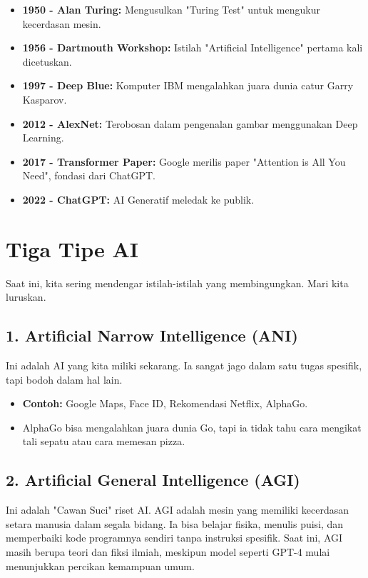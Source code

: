 \begin{itemize}
    \item \textbf{1950 - Alan Turing:} Mengusulkan "Turing Test" untuk mengukur kecerdasan mesin.
    \item \textbf{1956 - Dartmouth Workshop:} Istilah "Artificial Intelligence" pertama kali dicetuskan.
    \item \textbf{1997 - Deep Blue:} Komputer IBM mengalahkan juara dunia catur Garry Kasparov.
    \item \textbf{2012 - AlexNet:} Terobosan dalam pengenalan gambar menggunakan Deep Learning.
    \item \textbf{2017 - Transformer Paper:} Google merilis paper "Attention is All You Need", fondasi dari ChatGPT.
    \item \textbf{2022 - ChatGPT:} AI Generatif meledak ke publik.
\end{itemize}

\section{Tiga Tipe AI}

Saat ini, kita sering mendengar istilah-istilah yang membingungkan. Mari kita luruskan.

\subsection{1. Artificial Narrow Intelligence (ANI)}
Ini adalah AI yang kita miliki sekarang. Ia sangat jago dalam satu tugas spesifik, tapi bodoh dalam hal lain.
\begin{itemize}
    \item \textbf{Contoh:} Google Maps, Face ID, Rekomendasi Netflix, AlphaGo.
    \item AlphaGo bisa mengalahkan juara dunia Go, tapi ia tidak tahu cara mengikat tali sepatu atau cara memesan pizza.
\end{itemize}

\subsection{2. Artificial General Intelligence (AGI)}
Ini adalah "Cawan Suci" riset AI. AGI adalah mesin yang memiliki kecerdasan setara manusia dalam segala bidang. Ia bisa belajar fisika, menulis puisi, dan memperbaiki kode programnya sendiri tanpa instruksi spesifik. Saat ini, AGI masih berupa teori dan fiksi ilmiah, meskipun model seperti GPT-4 mulai menunjukkan percikan kemampuan umum.

